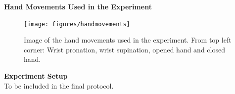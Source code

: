 \textbf{{\Large Hand Movements Used in the Experiment}} \\

\begin{figure}[H]                 
	\texttt{[image: figures/handmovements]}  
	\caption{Image of the hand movements used in the experiment. From top left corner: Wrist pronation, wrist supination, opened hand and closed hand.}
	\label{fig:handmovements} 
\end{figure}

\textbf{{\Large Experiment Setup}} \\
To be included in the final protocol.


